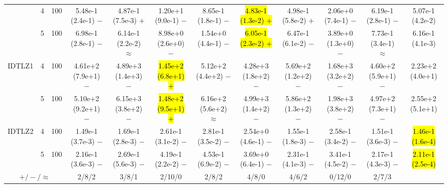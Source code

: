 \begin{table}
{\begin{tabular}{cccccccccccc}
& 4 & 100
& 5.48e-1 (2.4e-1) $-$
& 4.87e-1 (7.5e-3) $+$
& 1.20e+1 (9.0e-1) $-$
& 8.65e-1 (1.8e-1) $-$
& \hl{4.83e-1 (1.3e-2) $+$}
& 4.98e-1 (5.8e-2) $+$
& 2.06e+0 (7.4e-1) $-$
& 6.19e-1 (2.8e-1) $-$
& 5.07e-1 (4.2e-2) \\

& 5 & 100
& 6.98e-1 (2.8e-1) $-$
& 6.14e-1 (2.2e-2) $\approx$
& 8.98e+0 (2.6e+0) $-$
& 1.54e+0 (4.4e-1) $-$
& \hl{6.05e-1 (2.3e-2) $+$}
& 6.47e-1 (6.1e-2) $-$
& 3.89e+0 (1.3e+0) $-$
& 7.73e-1 (3.4e-1) $\approx$
& 6.16e-1 (4.1e-3) \\

\midrule

\multirow{2}{*}{IDTLZ1}
& 4 & 100
& 4.61e+2 (7.9e+1) $-$
& 4.89e+3 (1.4e+3) $-$
& \hl{1.45e+2 (6.8e+1) $+$}
& 5.12e+2 (4.4e+2) $-$
& 4.28e+3 (1.8e+2) $-$
& 5.69e+2 (1.2e+2) $-$
& 1.68e+3 (3.2e+2) $-$
& 4.60e+2 (5.9e+1) $-$
& 2.23e+2 (4.0e+1) \\

& 5 & 100
& 5.10e+2 (9.2e+1) $-$
& 6.15e+3 (3.8e+2) $-$
& \hl{1.48e+2 (9.5e+1) $+$}
& 6.16e+2 (5.6e+2) $\approx$
& 4.99e+3 (1.4e+2) $-$
& 5.86e+2 (1.3e+2) $-$
& 1.98e+3 (3.8e+2) $-$
& 4.97e+2 (7.3e+1) $-$
& 2.55e+2 (5.1e+1) \\

\midrule

\multirow{2}{*}{IDTLZ2}
& 4 & 100
& 1.49e-1 (3.7e-3) $-$
& 1.69e-1 (2.8e-3) $-$
& 2.61e-1 (3.1e-2) $-$
& 2.81e-1 (3.5e-2) $-$
& 2.54e+0 (4.6e-1) $-$
& 1.55e-1 (1.8e-3) $-$
& 2.58e-1 (3.4e-2) $-$
& 1.51e-1 (3.6e-3) $-$
& \hl{1.46e-1 (1.6e-4)} \\

& 5 & 100
& 2.16e-1 (3.6e-3) $-$
& 2.69e-1 (5.6e-3) $-$
& 4.19e-1 (2.2e-2) $-$
& 4.53e-1 (6.9e-2) $-$
& 3.69e+0 (6.4e-1) $-$
& 2.31e-1 (4.1e-3) $-$
& 3.41e-1 (4.5e-2) $-$
& 2.17e-1 (4.3e-3) $-$
& \hl{2.11e-1 (2.5e-4)} \\

\midrule
\multicolumn{3}{c}{$+/-/\approx$}
& 2/8/2 & 3/8/1 & 2/10/0 & 2/8/2 & 4/8/0 & 4/6/2 & 0/12/0 & 2/7/3 & \\
\bottomrule
\end{tabular}%
}
\end{table}
